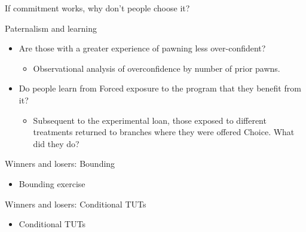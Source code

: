 \documentclass[8pt]{beamer}
\begin{document}
\begin{frame}{If commitment works, why don't people choose it?}
\end{frame}




\begin{frame}{Paternalism and learning}
    

    \begin{itemize}
    \item   Are those with a greater experience of pawning less over-confident?  
    \begin{itemize}
        \item Observational analysis of overconfidence by number of prior pawns.
    \end{itemize}  
    \item   Do people learn from Forced exposure to the program that they benefit from it?  
    \begin{itemize}
        \item Subsequent to the experimental loan, those exposed to different treatments returned to branches where they were offered Choice.  What did they do?
    \end{itemize}  

    \end{itemize}     

    
\end{frame}




\begin{frame}{Winners and losers:  Bounding}
    \begin{itemize}
        \item Bounding exercise
    \end{itemize}  

\end{frame}


\begin{frame}{Winners and losers:  Conditional TUTs}
     \begin{itemize}
        \item Conditional TUTs
    \end{itemize}  
 
\end{frame}
\end{document}
